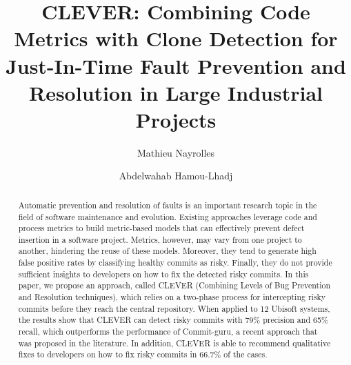 \documentclass[sigconf]{acmart}
\begin{document}
\title{CLEVER: Combining Code Metrics with Clone Detection for Just-In-Time
Fault Prevention and Resolution in Large Industrial Projects\vspace{0.5cm}}

\author{Mathieu Nayrolles}
\author{Abdelwahab Hamou-Lhadj}

\renewcommand{\shorttitle}{Combining Code Metrics With Clone Detection For Faults Prevention and Resolution}

\begin{abstract}
Automatic prevention and resolution of faults is an important research
topic in the field of software maintenance and evolution. Existing
approaches leverage code and process metrics to build metric-based
models that can effectively prevent defect insertion in a software
project. Metrics, however, may vary from one project to another,
hindering the reuse of these models. Moreover, they tend to generate
high false positive rates by classifying healthy commits as risky.
Finally, they do not provide sufficient insights to developers on how to
fix the detected risky commits. In this paper, we propose an approach,
called CLEVER (Combining Levels of Bug Prevention and Resolution
techniques), which relies on a two-phase process for intercepting risky
commits before they reach the central repository. When applied to 12
Ubisoft systems, the results show that CLEVER can detect risky commits
with 79\% precision and 65\% recall, which outperforms the performance
of Commit-guru, a recent approach that was proposed in the literature.
In addition, CLEVER is able to recommend qualitative fixes to developers
on how to fix risky commits in 66.7\% of the cases.
\end{abstract}

\end{document}
